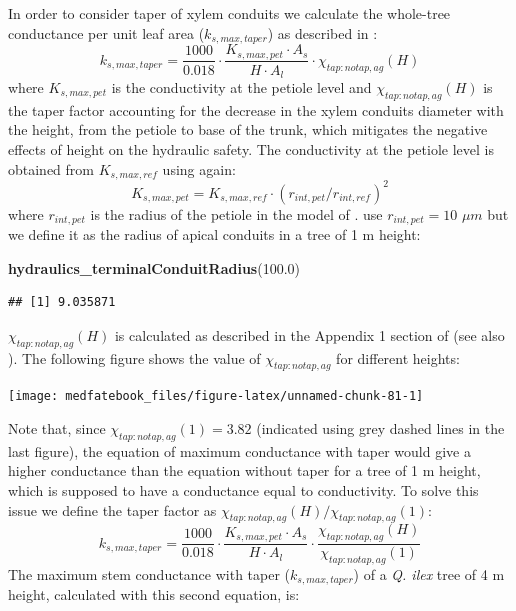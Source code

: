 \documentclass[]{book}
\newenvironment{Shaded}{\begin{snugshade}}{\end{snugshade}}
\newcommand{\KeywordTok}[1]{\textcolor[rgb]{0.13,0.29,0.53}{\textbf{#1}}}
\newcommand{\FloatTok}[1]{\textcolor[rgb]{0.00,0.00,0.81}{#1}}
\newcommand{\NormalTok}[1]{#1}
\begin{document}
In order to consider taper of xylem conduits we calculate the whole-tree conductance per unit leaf area (\(k_{s, max, taper}\)) as described in \citet{Christoffersen2016}:
\begin{equation}
k_{s, max, taper}=\frac{1000}{0.018} \cdot \frac{K_{s,max,pet}\cdot A_{s}}{H\cdot A_{l}}\cdot \chi_{tap:notap,ag}(H)
\end{equation}
where \(K_{s,max,pet}\) is the conductivity at the petiole level and \(\chi_{tap:notap,ag}(H)\) is the taper factor accounting for the decrease in the xylem conduits diameter with the height, from the petiole to base of the trunk, which mitigates the negative effects of height on the hydraulic safety. The conductivity at the petiole level is obtained from \(K_{s,max,ref}\) using again:
\begin{equation}
K_{s,max,pet} = K_{s,max,ref}\cdot (r_{int, pet}/r_{int,ref})^{2}
\end{equation}
where \(r_{int, pet}\) is the radius of the petiole in the model of \citet{Savage2010}. \citet{Christoffersen2016} use \(r_{int, pet} = 10\) \(\mu m\) but we define it as the radius of apical conduits in a tree of 1 m height:

\begin{Shaded}
\begin{Highlighting}[]
\KeywordTok{hydraulics_terminalConduitRadius}\NormalTok{(}\FloatTok{100.0}\NormalTok{)}
\end{Highlighting}
\end{Shaded}

\begin{verbatim}
## [1] 9.035871
\end{verbatim}

\(\chi_{tap:notap,ag}(H)\) is calculated as described in the Appendix 1 section of \citet{Christoffersen2016} (see also \citet{Savage2010}). The following figure shows the value of \(\chi_{tap:notap,ag}\) for different heights:

\begin{center}\texttt{[image: medfatebook\_files/figure-latex/unnamed-chunk-81-1]} \end{center}

Note that, since \(\chi_{tap:notap,ag}(1) = 3.82\) (indicated using grey dashed lines in the last figure), the equation of maximum conductance with taper would give a higher conductance than the equation without taper for a tree of 1 m height, which is supposed to have a conductance equal to conductivity. To solve this issue we define the taper factor as \(\chi_{tap:notap,ag}(H)/\chi_{tap:notap,ag}(1)\):
\begin{equation}
k_{s, max, taper}=\frac{1000}{0.018} \cdot \frac{K_{s,max,pet}\cdot A_{s}}{H\cdot A_{l}}\cdot \frac{\chi_{tap:notap,ag}(H)}{\chi_{tap:notap,ag}(1)}
\end{equation}
The maximum stem conductance with taper (\(k_{s, max, taper}\)) of a \emph{Q. ilex} tree of 4 m height, calculated with this second equation, is:
\end{document}
